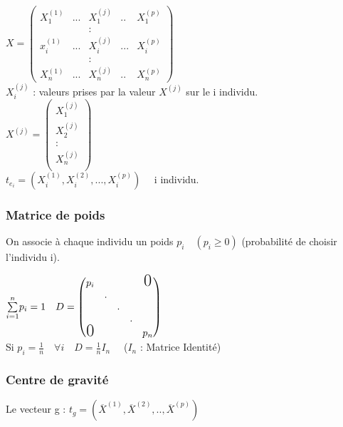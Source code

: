 \documentclass[a4paper, 12pt]{article}
\begin{document}
\begin{flushleft}
$X =
\begin{pmatrix}
   X^{(1)}_{1} & ... & X^{(j)}_{1} & .. & X^{(p)}_{1} \\
   & & : & & \\
   x^{(1)}_{i} & ... & X^{(j)}_{i} & ... & X^{(p)}_{i} \\
   & & : & & \\
   X^{(1)}_{n} & ... & X^{(j)}_{n} & .. & X^{(p)}_{n}
\end{pmatrix}
$ \\
\medskip
$X^{(j)}_{i}$ : valeurs prises par la valeur $X^{(j)}$ sur le i individu. \\
\medskip
$
X^{(j)} =
\begin{pmatrix}
X^{(j)}_{1} \\
X^{(j)}_{2} \\
: \\
X^{(j)}_{n} \\
\end{pmatrix}
$ \\
\medskip
$t_{e_{i}} = (X^{(1)}_i, X^{(2)}_i, ..., X^{(p)}_i) \quad$ i individu. \\
\end{flushleft}


\subsubsection{Matrice de poids}
On associe à chaque individu un poids $p_i \quad (p_i \geq 0)$ (probabilité de choisir l'individu i). \\

\begin{flushleft}
$\overset{n}{\underset{i = 1}{\sum}} p_i = 1 \quad D = 
\begin{pmatrix}
p_i & & & & \text{\LARGE 0} \\
& . & & & \\
& & . & & \\
& & & .  &\\
\text{\LARGE 0} & & & & p_n \\
\end{pmatrix}
$ \\
\medskip
Si $p_i = \frac{1}{n} \quad \forall i \quad D = \frac{1}{n} I_n \quad$ ($I_n$ : Matrice Identité) \\
\end{flushleft}


\subsubsection{Centre de gravité}
Le vecteur g : $t_g = (\overline{X}^{(1)}, \overline{X}^{(2)}, .., \overline{X}^{(p)})$ \\
\end{document}
